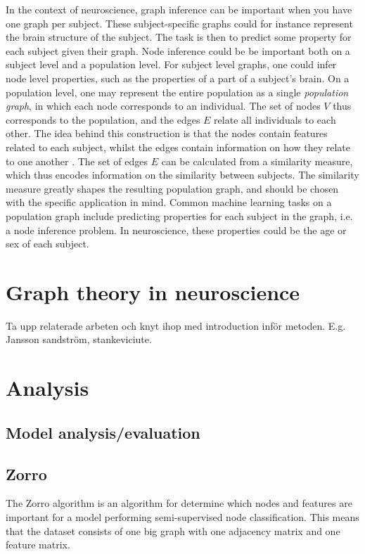 In the context of neuroscience, graph inference can be important when you have one graph per subject. These subject-specific graphs could for instance represent the brain structure of the subject. The task is then to predict some property for each subject given their graph. Node inference could be be important both on a subject level and a population level. For subject level graphs, one could infer node level properties, such as the properties of a part of a subject's brain. On a population level, one may represent the entire population as a single \textit{population graph}, in which each node corresponds to an individual. The set of nodes $V$ thus corresponds to the population, and the edges $E$ relate all individuals to each other. The idea behind this construction is that the nodes contain features related to each subject, whilst the edges contain information on how they relate to one another \cite{stankeviciute}. The set of edges $E$ can be calculated from a similarity measure, which thus encodes information on the similarity between subjects. The similarity measure greatly shapes the resulting population graph, and should be chosen with the specific application in mind. Common machine learning tasks on a population graph include predicting properties for each subject in the graph, i.e. a node inference problem. In neuroscience, these properties could be the age or sex of each subject.  

\section{Graph theory in neuroscience}
Ta upp relaterade arbeten och knyt ihop med introduction inför metoden. E.g. Jansson sandström, stankeviciute.


\section{Analysis}
\subsection{Model analysis/evaluation}
\subsection{Zorro}
The Zorro algorithm is an algorithm for determine which nodes and features are important for a model performing semi-supervised node classification. This means that the dataset consists of one big graph with one adjacency matrix and one feature matrix.

